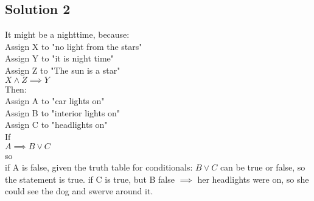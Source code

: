 \documentclass{article}
\begin{document}
\subsection{Solution 2}
It might be a nighttime, because: \\
Assign X to "no light from the stars" \\
Assign Y to "it is night time" \\
Assign Z to "The sun is a star" \\
$X \wedge Z \implies Y$ \\
Then: \\
Assign A to "car lights on" \\
Assign B to "interior lights on" \\
Assign C to "headlights on" \\
If \\
$A \implies B \vee C$ \\
so \\
if A is false, given the truth table for conditionals: $B \vee C$ can be true or false, so the statement is true.
if C is true, but B false $\implies$ her headlights were on, so she could see the dog and swerve around it.
\end{document}
